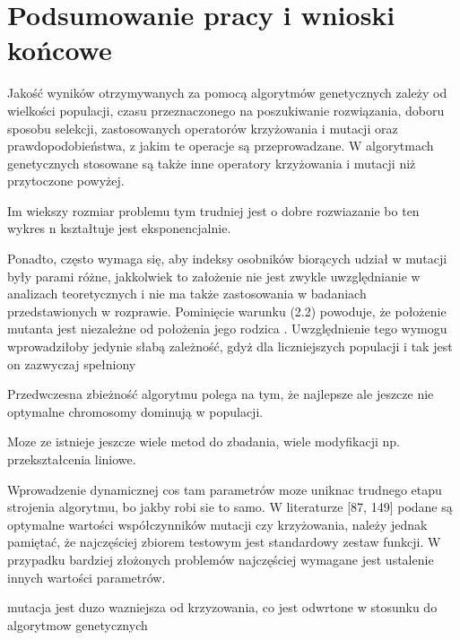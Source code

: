 \chapter{Podsumowanie pracy i wnioski końcowe}\label{cha:pierwszyDokument}

Jakość wyników otrzymywanych za pomocą algorytmów genetycznych zależy
od wielkości populacji, czasu przeznaczonego na poszukiwanie rozwiązania, doboru
sposobu selekcji, zastosowanych operatorów krzyżowania i mutacji oraz prawdopodobieństwa, z jakim te operacje są przeprowadzane. W algorytmach genetycznych
stosowane są także inne operatory krzyżowania i mutacji niż przytoczone powyżej. \\
\par
Im wiekszy rozmiar problemu tym trudniej jest o dobre rozwiazanie bo ten wykres n kształtuje jest eksponencjalnie.\\
\par
 Ponadto,
często wymaga się, aby indeksy osobników biorących udział w mutacji były parami
różne, jakkolwiek to założenie nie jest zwykle uwzględnianie w analizach teoretycznych
i nie ma także zastosowania w badaniach przedstawionych w rozprawie. Pominięcie
warunku (2.2) powoduje, że położenie mutanta 
jest niezależne od położenia jego
rodzica \cite{diff2}
. Uwzględnienie tego wymogu wprowadziłoby jedynie słabą zależność,
gdyż dla liczniejszych populacji i tak jest on zazwyczaj spełniony
\par
Przedwczesna zbieżność algorytmu polega na tym, że najlepsze ale jeszcze nie optymalne chromosomy
dominują w populacji. 
\par
Moze ze istnieje jeszcze wiele metod do zbadania, wiele modyfikacji np. przekształcenia liniowe.
\par
Wprowadzenie dynamicznej cos tam parametrów moze uniknac trudnego etapu strojenia algorytmu, bo jakby robi sie to samo. W literaturze [87, 149] podane są
optymalne wartości współczynników mutacji czy krzyżowania, należy jednak pamiętać, że najczęściej zbiorem testowym jest standardowy zestaw funkcji. W przypadku bardziej złożonych problemów najczęściej wymagane jest ustalenie innych
wartości parametrów.
\par
mutacja jest duzo wazniejsza od krzyzowania, co jest odwrtone w stosunku do algorytmow genetycznych